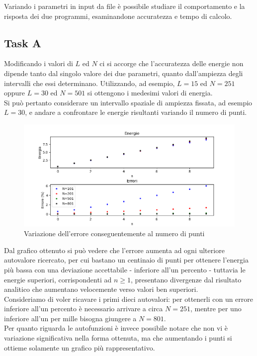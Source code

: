 \documentclass[a4paper,11pt]{article}
\begin{document}
Variando i parametri in input da file è possibile studiare il comportamento e la risposta dei due programmi, esaminandone accuratezza e tempo di calcolo.

\subsection*{Task A}
Modificando i valori di $L$ ed $N$ ci si accorge che l'accuratezza delle energie non dipende tanto dal singolo valore dei due parametri, quanto dall'ampiezza degli intervalli che essi determinano. Utilizzando, ad esempio, $L=15$ ed $N=251$ oppure $L=30$ ed $N=501$ si ottengono i medesimi valori di energia. \\

Si può pertanto considerare un intervallo spaziale di ampiezza fissata, ad esempio $L=30$, e andare a confrontare le energie risultanti variando il numero di punti.\\

\begin{figure}[h]
\includegraphics[width=\textwidth]{Differenze.png}
\caption{Variazione dell'errore conseguentemente al numero di punti}
\end{figure}

Dal grafico ottenuto si può vedere che l'errore aumenta ad ogni ulteriore autovalore ricercato, per cui bastano un centinaio di punti per ottenere l'energia più bassa con una deviazione accettabile - inferiore all'un percento - tuttavia le energie superiori, corrispondenti ad $n \ge 1$, presentano divergenze dal risultato analitico che aumentano velocemente verso valori ben superiori. \\
Consideriamo di voler ricavare i primi dieci autovalori: per ottenerli con un errore inferiore all'un percento è necessario arrivare a circa $N=251$, mentre per uno inferiore all'un per mille bisogna giungere a $N=801$. \\
Per quanto riguarda le autofunzioni è invece possibile notare che non vi è variazione significativa nella forma ottenuta, ma che aumentando i punti si ottieme solamente un grafico più rappresentativo.
\end{document}
